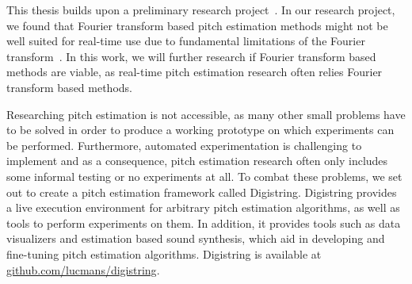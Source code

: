 \documentclass[a4paper,10pt,twocolumn]{article}
\begin{document}
This thesis builds upon a preliminary research project~\cite{ik}. In our research project, we found that Fourier transform based pitch estimation methods might not be well suited for real-time use due to fundamental limitations of the Fourier transform~\cite{fourierlimit}. In this work, we will further research if Fourier transform based methods are viable, as real-time pitch estimation research often relies Fourier transform based methods.

Researching pitch estimation is not accessible, as many other small problems have to be solved in order to produce a working prototype on which experiments can be performed. Furthermore, automated experimentation is challenging to implement and as a consequence, pitch estimation research often only includes some informal testing or no experiments at all. To combat these problems, we set out to create a pitch estimation framework called Digistring. Digistring provides a live execution environment for arbitrary pitch estimation algorithms, as well as tools to perform experiments on them. In addition, it provides tools such as data visualizers and estimation based sound synthesis, which aid in developing and fine-tuning pitch estimation algorithms. Digistring is available at \url{github.com/lucmans/digistring}.

\end{document}
